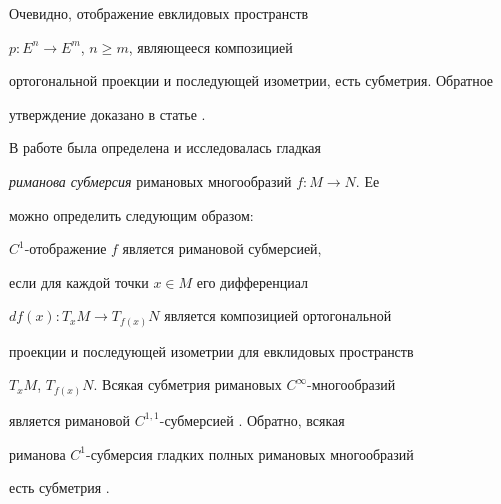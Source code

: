 \begin{exams}


\label{ex8}


Очевидно, отображение евклидовых пространств


$p: E^{n} \rightarrow E^{m}$, $n \geq m$, являющееся композицией


ортогональной проекции и последующей изометрии, есть субметрия. Обратное


утверждение доказано в статье \cite{BS}.


\end{exams}





\begin{exams}


\label{ex9}


В работе \cite{ON} была определена и исследовалась гладкая


{\it риманова субмерсия} римановых многообразий $f:M \rightarrow N$. Ее


можно определить следующим образом:


$C^{1}$-ото\-бражение $f$ является римановой субмерсией,


если для каждой точки $x \in M$ его дифференциал


$df(x):T_{x}M \rightarrow T_{f(x)}N$ является композицией ортогональной


проекции и последующей изометрии для евклидовых пространств


$T_{x}M$, $T_{f(x)}N$. Всякая субметрия римановых $C^{\infty}$-многообразий


является римановой $C^{1,1}$-субмерсией \cite{BG}. Обратно, всякая


риманова $C^{1}$-субмерсия гладких полных римановых многообразий


есть субметрия \cite{BN}.


\end{exams}





